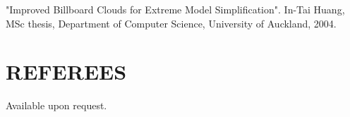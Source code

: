 \begin{resume}
"Improved Billboard Clouds for Extreme Model Simplification". In-Tai Huang, MSc thesis, Department of Computer Science, University of Auckland, 2004.

\section{REFEREES} 
\vspace{0.1in}

Available upon request.
 
\end{resume}































